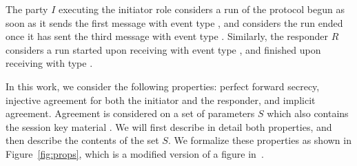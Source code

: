 The party $I$ executing the initiator role considers a run of the protocol
begun as soon as it sends the first message \mMsgone{} with event type
\mIStart, and considers the run ended once it has sent the third message
\mMsgthree{} with event type \mIComplete.
%
Similarly, the responder $R$ considers a run started upon receiving \mMsgone{}
with event type \mRStart, and finished upon receiving \mMsgthree{} with type
\mRComplete.
%

In this work, we consider the following properties:
perfect forward secrecy, injective agreement for both the initiator and the
responder, and implicit agreement.
%
Agreement is considered on a set of parameters $S$ which also contains the
session key material \mSessKey{}.
%
We will first describe in detail both properties, and then describe the
contents of the set $S$.
%
We formalize these properties as shown in Figure~\ref{fig:props}, which is
a modified version of a figure in~\cite{Norr21}.


